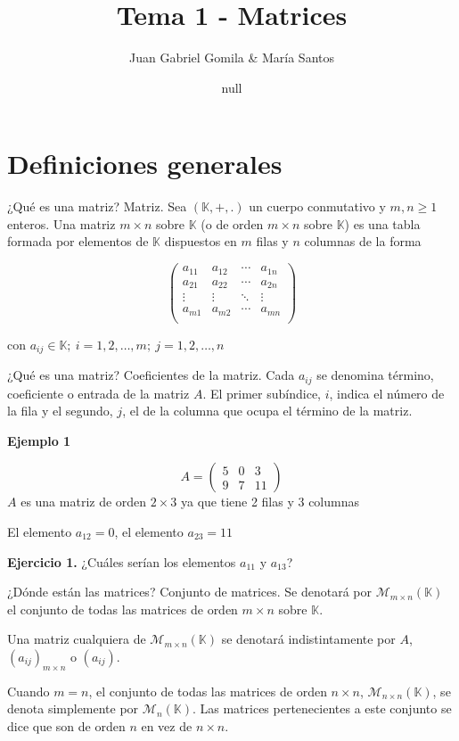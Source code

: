 \documentclass[
  ignorenonframetext,
]{beamer}
\title{Tema 1 - Matrices}
\author{Juan Gabriel Gomila \& María Santos}
\date{null}
\begin{document}
\frame{\titlepage}

\hypertarget{definiciones-generales}{%
\section{Definiciones generales}\label{definiciones-generales}}

\begin{frame}{¿Qué es una matriz?}
\protect\hypertarget{quuxe9-es-una-matriz}{}
Matriz. Sea \((\mathbb{K},+,.)\) un cuerpo conmutativo y \(m,n\ge1\)
enteros. Una matriz \(m\times n\) sobre \(\mathbb{K}\) (o de orden
\(m\times n\) sobre \(\mathbb{K}\)) es una tabla formada por elementos
de \(\mathbb{K}\) dispuestos en \(m\) filas y \(n\) columnas de la forma

\[\begin{pmatrix}a_{11} & a_{12} & \cdots & a_{1n}\\  a_{21} & a_{22} & \cdots & a_{2n}\\ \vdots & \vdots & \ddots & \vdots\\ a_{m1} & a_{m2} & \cdots & a_{mn}\\ \end{pmatrix}\]

con \(a_{ij}\in\mathbb{K};\ i=1,2,\dots,m;\ j=1,2,\dots,n\)
\end{frame}

\begin{frame}{¿Qué es una matriz?}
\protect\hypertarget{quuxe9-es-una-matriz-1}{}
Coeficientes de la matriz. Cada \(a_{ij}\) se denomina término,
coeficiente o entrada de la matriz \(A\). El primer subíndice, \(i\),
indica el número de la fila y el segundo, \(j\), el de la columna que
ocupa el término de la matriz.

\textbf{Ejemplo 1}

\[A = \begin{pmatrix}5 & 0 & 3\\ 9 & 7 & 11\end{pmatrix}\] \(A\) es una
matriz de orden \(2\times 3\) ya que tiene 2 filas y 3 columnas

El elemento \(a_{12}=0\), el elemento \(a_{23}=11\)

\textbf{Ejercicio 1.} ¿Cuáles serían los elementos \(a_{11}\) y
\(a_{13}\)?
\end{frame}

\begin{frame}{¿Dónde están las matrices?}
\protect\hypertarget{duxf3nde-estuxe1n-las-matrices}{}
Conjunto de matrices. Se denotará por
\(\mathcal{M}_{m\times n}(\mathbb{K})\) el conjunto de todas las
matrices de orden \(m \times n\) sobre \(\mathbb{K}\).

Una matriz cualquiera de \(\mathcal{M}_{m\times n}(\mathbb{K})\) se
denotará indistintamente por \(A\), \((a_{ij})_{m\times n}\) o
\((a_{ij})\).

Cuando \(m=n\), el conjunto de todas las matrices de orden
\(n \times n\), \(\mathcal{M}_{n\times n}(\mathbb{K})\), se denota
simplemente por \(\mathcal{M}_{n}(\mathbb{K})\). Las matrices
pertenecientes a este conjunto se dice que son de orden \(n\) en vez de
\(n\times n\).
\end{frame}
\end{document}
